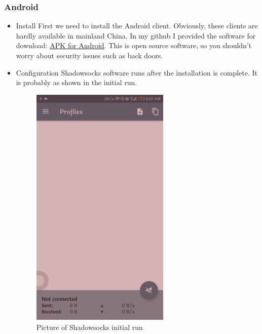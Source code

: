 \documentclass[12pt]{wx672article}
\begin{document}
\subsubsection*{Android}
\label{sec:org354bc5b}
\begin{itemize}
\item Install
\label{sec:org084bd83}
First we need to install the Android client. Obviously, these clients are hardly available
in mainland China. In my github I provided the software for download: \href{https://github.com/Puqiyuan/Shadowsocks\_Install/blob/master/Shadowsocks.apk}{APK for
Android}. This is open source software, so you shouldn’t worry about security issues such
as back doors.

\item Configuration
\label{sec:orgb98c8c3}
Shadowsocks software runs after the installation is complete. It is probably as shown in
the initial run.

\begin{figure}[!htb]
\centering
\includegraphics[width=250px]{./images/androidPhone1.jpg}
\caption{\label{fig:orge8c1dfe}
Picture of Shadowsocks initial run}
\end{figure}


\end{itemize}
\end{document}
